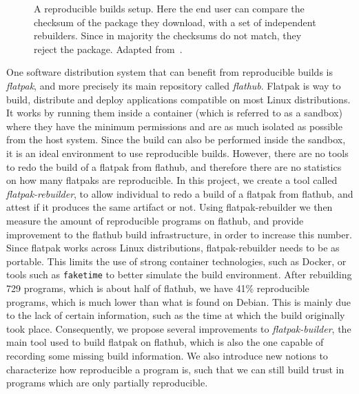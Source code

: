 \documentclass[a4paper,11pt,oneside]{report}
\theoremstyle{definition}
\newcommand{\sysname}{flatpak-rebuilder\xspace}
\newcommand{\rb}{reproducible builds\xspace}
\newcommand{\fp}{flatpak\xspace}
\newcommand{\Fp}{Flatpak\xspace}
\newcommand{\fh}{flathub\xspace}
\newcommand{\fb}{flatpak-builder\xspace}
\begin{document}
\begin{figure}[h]
    \caption{A reproducible builds setup. Here the end user can compare the
    checksum of the package they download, with a set of independent
    rebuilders. Since in majority the checksums do not match, they reject the
    package. Adapted from~\cite{DBLP:journals/corr/abs-2104-06020}.}
    \label{fig:reprobuild}
\end{figure}

One software distribution system that can benefit from \rb is \emph{\fp}, and
more precisely its main repository called \emph{\fh}. \Fp is way to build,
distribute and deploy applications compatible on most Linux distributions. It
works by running them inside a container (which is referred to as a sandbox)
where they have the minimum permissions and are as much isolated as possible
from the host system. Since the build can also be performed inside the sandbox,
it is an ideal environment to use \rb. However, there are no tools to redo the
build of a \fp from \fh, and therefore there are no statistics on how many
flatpaks are reproducible. In this project, we create a tool called
\emph{\sysname}, to allow individual to redo a build of a \fp from \fh, and
attest if it produces the same artifact or not. Using \sysname we then measure
the amount of reproducible programs on \fh, and provide improvement to the \fh
build infrastructure, in order to increase this number. Since \fp works across
Linux distributions, \sysname needs to be as portable. This limits the use of
strong container technologies, such as Docker, or tools such as \verb|faketime|
to better simulate the build environment.
After rebuilding 729 programs, which is about half of \fh, we have 41\%
reproducible programs, which is much lower than what is found on Debian. This
is mainly due to the lack of certain information, such as the time at which the
build originally took place. Consequently, we propose several improvements to
\emph{\fb}, the main tool used to build \fp on \fh, which is also the one
capable of recording some missing build information. We also introduce new
notions to characterize how reproducible a program is, such that we can still
build trust in programs which are only partially reproducible.
\end{document}
